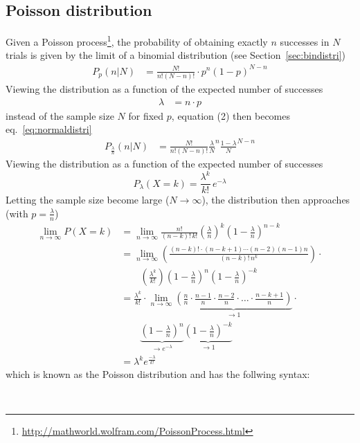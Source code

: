 \documentclass[11pt,english,BCOR10mm,DIV12,bibliography=totoc,parskip=false,
   smallheadings, headexclude,footexclude,oneside]{pst-doc}
\begin{document}
\subsection{Poisson distribution}
Given a Poisson process\footnote{\url{http://mathworld.wolfram.com/PoissonProcess.html}}, 
the probability of obtaining exactly $n$ successes in $N$ trials is given by the 
limit of a binomial distribution (see Section~\ref{sec:bindistri})
%
\begin{align}
P_p(n|N) &= \frac{N!}{n!(N-n)!}\cdot p^n(1-p)^{N-n}\label{eq:normaldistri}
\end{align}
%
Viewing the distribution as a function of the expected number of successes
%	
\begin{align}\label{eq:nu}
\lambda &= n\cdot p
\end{align}
%
instead of the sample size $N$ for fixed $p$, equation (2) then becomes
eq.~\ref{eq:normaldistri}
%	
\begin{align}\label{eq:nuN}
P_{\frac{\lambda}{n}}(n|N) &= \frac{N!}{n!(N-n)!}{\frac{\lambda}{N}}^n {\frac{1-\lambda}{N}}^{N-n}
\end{align}
%
Viewing the distribution as a function of the expected number of successes
%
\[ P_\lambda(X=k)=\frac{\lambda^k}{k!}\,e^{-\lambda} \]
%
Letting the sample size  become large ($N\to\infty$), the distribution then 
approaches (with $p=\frac{\lambda}{n}$)
%
\begin{align}
\lim_{n\to\infty} P(X=k) &= \lim_{n\to\infty}\frac{n!}{(n-k)!\,k!}
	 \left(\frac{\lambda}{n}\right)^k \left(1-\frac{\lambda}{n}\right)^{n-k} \\
  &= \lim_{n\to\infty} \left(\frac{(n-k)!\cdot (n-k+1)\cdots(n-2)(n-1)n}{(n-k)!\,n^k}\right)\cdot\\
  &\qquad \left(\frac{\lambda^k}{k!}\right)\left(1-\frac{\lambda}{n}\right)^n 
	\left(1-\frac{\lambda}{n}\right)^{-k}\\
  &= \frac{\lambda^k}{k!}\cdot \lim_{n\to\infty}
     \underbrace{\left(\frac{n}{n}\cdot \frac{n-1}{n}\cdot\frac{n-2}{n}\cdot\ldots\cdot 
    	\frac{n-k+1}{n}\right)}_{\to 1} \cdot\\
  &\qquad   \underbrace{\left(1-\frac{\lambda}{n}\right)^n}_{\to{e^{-\lambda}}}  
     \underbrace{\left(1-\frac{\lambda}{n}\right)^{-k}}_{\to 1}\\
  &=  \lambda^k e^{\frac{-\lambda}{k!}}
\end{align}
%
which is known as the Poisson distribution and has the follwing syntax:


\begin{BDef}
\OptArgs{}\\
\OptArgs{}
\end{BDef}
\end{document}
